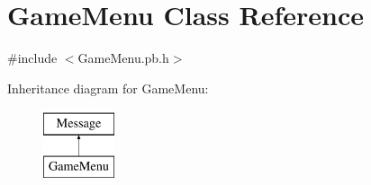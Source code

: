 \hypertarget{class_game_menu}{\section{Game\-Menu Class Reference}
\label{class_game_menu}
}


{\ttfamily \#include $<$Game\-Menu.\-pb.\-h$>$}

Inheritance diagram for Game\-Menu\-:\begin{figure}[H]
\begin{center}
\leavevmode
\includegraphics[height=2.000000cm]{class_game_menu}
\end{center}
\end{figure}
